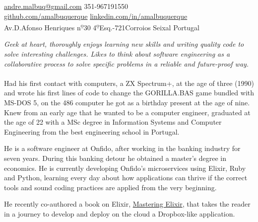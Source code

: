 \documentclass[10pt,a4paper]{article}
\newcommand{\ulo}{\textsuperscript{\b{o}}} %
\begin{document}
\sloppy  %



\nobreakvspace{0.3em}  %

\noindent\href{mailto:andre.malbuq.at.gmail.com}{andre.malbuq\mbox{}@\mbox{}gmail.com}\sbull
\textsmaller{+}351-967191550
\\
\noindent\href{https://github.com/amalbuquerque}{github.com/amalbuquerque}\sbull
\href{http://linkedin.com/in/amalbuquerque}{linkedin.com/in/amalbuquerque}
\\
Av.\thinspace D.\thinspace Afonso Henriques n\ulo 30 4\ulo Esq.-721\thinspace Corroios\sbull
Seixal\sbull
Portugal

\spacedhrule{0.9em}{-0.4em}  %


\vspace{-1.3em}  %
\begin{multicols}{2}  %
\noindent \emph{Geek at heart, thoroughly enjoys learning new skills and writing
  quality code to solve interesting challenges. Likes to think about software
  engineering as a collaborative process to solve specific problems in a
  reliable and future-proof way.}
\\
\\
Had his first contact with computers, a ZX Spectrum+, at the age of three
(1990) and wrote his first lines of code to change the GORILLA.BAS game bundled
with MS-DOS 5, on the 486 computer he got as a birthday present at the age of
nine. Knew from an early age that he wanted to be a computer engineer,
graduated at the age of 22 with a MSc degree in Information Systems and Computer
Engineering from the best engineering school in Portugal.

He is a software engineer at Onfido, after working in the banking industry for
seven years. During this banking detour he obtained a master's degree in
economics. He is currently developing Onfido's microservices using Elixir,
Ruby and Python, learning every day about how applications can thrive
if the correct tools and sound coding practices are applied from the very
beginning.

He recently co-authored a book on Elixir,
\href{https://www.packtpub.com/application-development/mastering-elixir}{Mastering
Elixir}, that takes the reader in a journey to develop and deploy on the cloud
a Dropbox-like application.
\end{multicols}
\end{document}
